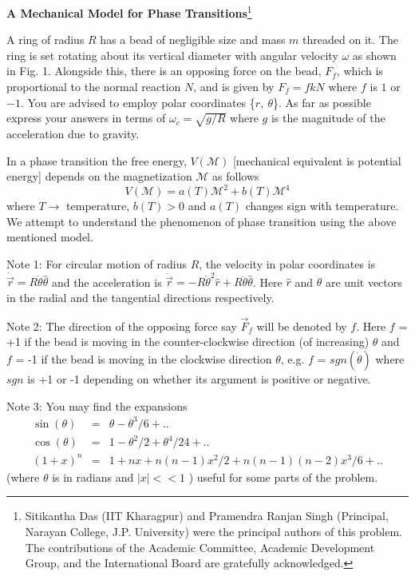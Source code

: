 {\large\textbf{A Mechanical Model for Phase Transitions}}\footnote{Sitikantha Das (IIT Kharagpur) and Pramendra Ranjan Singh (Principal, Narayan College, J.P. University) were the principal authors of this problem. The contributions of the Academic Committee, Academic Development Group, and the International Board are gratefully acknowledged.}

A ring of radius $R$ has a bead of negligible size and mass $m$ threaded on
it. The ring is set rotating about its vertical diameter with angular velocity
$\omega$ as shown in Fig. 1. Alongside this, there is an opposing force on the
bead, $F_f$, which is proportional to the normal reaction $N$, and is given by
$F_f = fkN$ where $f$ is $1$ or $-1$. You are advised to employ polar
coordinates \{$r,\ \theta$\}. As far as possible express your answers in terms
of $\omega_c = \sqrt{g/R}$ where $g$ is the magnitude of the acceleration due
to gravity.

In a phase transition the free energy, $V(\mathcal{M})$ [mechanical equivalent
is potential energy] depends on the magnetization $\mathcal{M}$ as follows
\[
V(\mathcal{M}) = a(T)\mathcal{M}^2 + b(T)\mathcal{M}^4
\]
where $T\!\rightarrow$ temperature, $b(T) > 0$ and $a(T)$ changes sign with
temperature. We attempt to understand the phenomenon of phase transition using
the above mentioned model.

Note 1: For circular motion of radius $R$, the velocity in polar coordinates is
$\dot{\vec{r}} = R\dot{\theta}\hat{\theta}$ and the acceleration is
$\ddot{\vec{r}} = -R\dot{\theta}^2\hat{r} + R\ddot{\theta}\hat{\theta}$. Here
$\hat{r}$ and $\hat{\theta}$ are unit vectors in the radial and the tangential
directions respectively.

Note 2: The direction of the opposing force say $\vec{F}_f$ will be denoted by
$f$. Here $f$ = +1 if the bead is moving in the counter-clockwise direction (of
increasing) $\theta$ and $f$ = -1 if the bead is moving in the clockwise
direction $\theta$, e.g. $f$ = $sgn(\dot{\theta})$ where $sgn$ is +1 or -1
depending on whether its argument is positive or negative.

Note 3: You may find the expansions
\[
\begin{array}{rcl}
\sin(\theta) & = & \theta - \theta^3/6 + ..\\
\cos(\theta) & = & 1 - \theta^2/2 + \theta^4/24 + ..\\
(1+x)^n & = & 1 + nx + n(n-1)x^2/2 + n(n-1)(n-2)x^3/6 + ..
\end{array}
\]
(where $\theta$ is in radians and $|x| << 1$ ) useful for some parts of the
problem.

